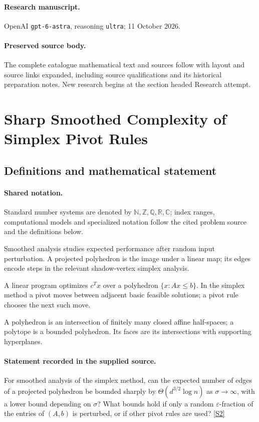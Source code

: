 \documentclass[11pt]{article}
\begin{document}
\paragraph{Research manuscript.} OpenAI \texttt{gpt-6-astra}, reasoning \texttt{ultra}; 11 October 2026.
\paragraph{Preserved source body.} The complete catalogue mathematical text and sources follow with layout and source links expanded, including source qualifications and its historical preparation notes. New research begins at the section headed Research attempt.

\section{Sharp Smoothed Complexity of Simplex Pivot Rules}\label{statement}

\subsection{Definitions and mathematical statement}

\paragraph{Shared notation.}Standard number systems are denoted by $\mathbb N,\mathbb Z,\mathbb Q,\mathbb R,\mathbb C$; index ranges, computational models and specialized notation follow the cited problem source and the definitions below.


Smoothed analysis studies expected performance after random input perturbation. A projected polyhedron is the image under a linear map; its edges encode steps in the relevant shadow-vertex simplex analysis.

A linear program optimizes $c^Tx$ over a polyhedron $\{x:Ax\leq b\}$. In the simplex method a pivot moves between adjacent basic feasible solutions; a pivot rule chooses the next such move.

A polyhedron is an intersection of finitely many closed affine half-spaces; a polytope is a bounded polyhedron. Its faces are its intersections with supporting hyperplanes.
\paragraph{Statement recorded in the supplied source.}
For smoothed analysis of the simplex method, can the expected number of edges of a projected polyhedron be bounded sharply by $\Theta(d^{3/2}\log n)$ as $\sigma\to\infty$, with a lower bound depending on $\sigma$? What bounds hold if only a random $\varepsilon$-fraction of the entries of $(A,b)$ is perturbed, or if other pivot rules are used? \href{https://doi.org/10.4171/owr/2018/54}{[S2]}
\end{document}
